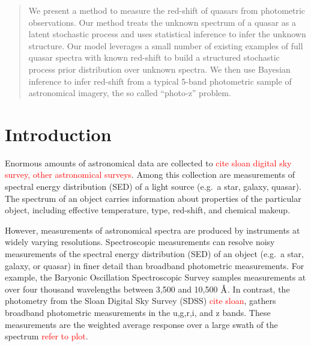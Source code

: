 \documentclass{article}
\newcommand{\angstrom}{\textup{\AA}}
\newcommand{\red}[1]{\textcolor{red}{#1}}
\begin{document}
 

\twocolumn[
\icmltitle{A Stochastic Process Model of Quasar Spectroscopy} %

\icmlauthor{Andrew Miller}{acm@seas.harvard.edu}
\icmladdress{Harvard University,
            33 Oxford St, Cambridge, MA USA}

\icmlkeywords{boring formatting information, machine learning, ICML}

\vskip 0.3in
]

\begin{abstract} 
We present a method to measure the red-shift of quasars from photometric observations.  Our method treats the unknown spectrum of a quasar as a latent stochastic process and uses statistical inference to infer the unknown structure.  Our model leverages a small number of existing examples of full quasar spectra with known red-shift to build a structured stochastic process prior distribution over unknown spectra.  We then use Bayesian inference to infer red-shift from a typical 5-band photometric sample of astronomical imagery, the so called ``photo-z'' problem. 
\end{abstract} 

\section{Introduction}

Enormous amounts of astronomical data are collected to \red{cite sloan digital sky survey, other astronomical surveys}.  Among this collection are measurements of spectral energy distribution (SED) of a light source (e.g.~a star, galaxy, quasar).  
The spectrum of an object carries information about properties of the particular object, including effective temperature, type, red-shift, and chemical makeup.  

However, measurements of astronomical spectra are produced by instruments at widely varying resolutions.  
Spectroscopic measurements can resolve noisy measurements of the spectral energy distribution (SED) of an object (e.g.~a star, galaxy, or quasar) in finer detail than broadband photometric measurements.  For example, the Baryonic Oscillation Spectroscopic Survey \cite{dawson2013baryon} samples measurements at over four thousand wavelengths between 3,500 and 10,500 $\angstrom$.  In contrast, the photometry from the Sloan Digital Sky Survey (SDSS) \red{cite sloan}, gathers broadband photometric measurements in the u,g,r,i, and z bands.  These measurements are the weighted average response over a large swath of the spectrum \red{refer to plot}. 
\end{document}
